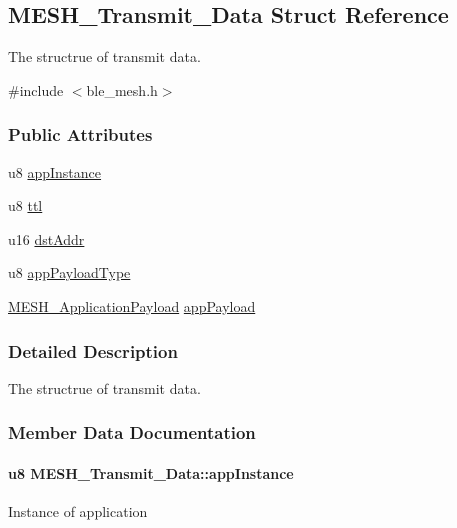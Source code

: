 \hypertarget{struct_m_e_s_h___transmit___data}{}\subsection{M\+E\+S\+H\+\_\+\+Transmit\+\_\+\+Data Struct Reference}
\label{struct_m_e_s_h___transmit___data}


The structrue of transmit data.  




{\ttfamily \#include $<$ble\+\_\+mesh.\+h$>$}

\subsubsection*{Public Attributes}
\begin{DoxyCompactItemize}
\item 
u8 \hyperlink{struct_m_e_s_h___transmit___data_a301c5b01d1ef875ad5d85dc59c70fba7}{app\+Instance}
\item 
u8 \hyperlink{struct_m_e_s_h___transmit___data_a11321e1d4fff77e8708480f9b9801be0}{ttl}
\item 
u16 \hyperlink{struct_m_e_s_h___transmit___data_a1bdc34f38d6429b5a63722191881af5b}{dst\+Addr}
\item 
u8 \hyperlink{struct_m_e_s_h___transmit___data_a9a27a301158fadc7680b6c7bf06748b9}{app\+Payload\+Type}
\item 
\hyperlink{union_m_e_s_h___application_payload}{M\+E\+S\+H\+\_\+\+Application\+Payload} \hyperlink{struct_m_e_s_h___transmit___data_a749297c8cd07247a34d56561ffe1970c}{app\+Payload}
\end{DoxyCompactItemize}


\subsubsection{Detailed Description}
The structrue of transmit data. 

\subsubsection{Member Data Documentation}
\paragraph[{\texorpdfstring{app\+Instance}{appInstance}}]{\setlength{\rightskip}{0pt plus 5cm}u8 M\+E\+S\+H\+\_\+\+Transmit\+\_\+\+Data\+::app\+Instance}\hypertarget{struct_m_e_s_h___transmit___data_a301c5b01d1ef875ad5d85dc59c70fba7}{}\label{struct_m_e_s_h___transmit___data_a301c5b01d1ef875ad5d85dc59c70fba7}
Instance of application 
